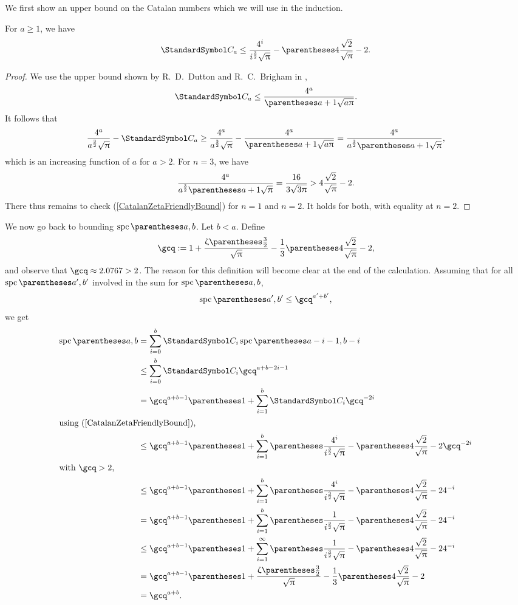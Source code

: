 We first show an upper bound on the Catalan numbers which we will use in the induction.
\begin{remark}
For $a\geq 1$, we have\begin{equation}
\CatalanNumber a \leq \frac{4^i}{i^{\frac 3 2}\sqrt{\Pi}}-\pa{4\frac {\sqrt 2} {\sqrt \Pi}-2} \text.\label{CatalanZetaFriendlyBound}
\end{equation}
\begin{proof}
We use the upper bound shown by R.~D.~Dutton and R.~C.~Brigham in \cite{DuttonBrigham1986},\[
\CatalanNumber a\leq \frac{4^a}{\pa{a+1}\sqrt{a\Pi}}\text.
\]
It follows that\[
\frac{4^a}{a^{\frac 3 2}\sqrt{\Pi}} - \CatalanNumber a \geq \frac{4^a}{a^{\frac 3 2}\sqrt{\Pi}} - \frac{4^a}{\pa{a+1}\sqrt{a\Pi}} = \frac{4^a}{a^{\frac 3 2}\pa{a+1}\sqrt{\Pi}}\text,
\]
which is an increasing function of $a$ for $a>2$. For $n=3$, we have\[
\frac{4^a}{a^{\frac 3 2}\pa{a+1}\sqrt{\Pi}}=\frac{16}{3\sqrt{3\Pi}}>4\frac {\sqrt 2} {\sqrt \Pi}-2\text.
\]
There thus remains to check (\ref{CatalanZetaFriendlyBound}) for $n=1$ and $n=2$. It holds for both, with equality at $n=2$.
\end{proof}
\end{remark}
We now go back to bounding $\spc\of{a,b}$.
Let $b<a$. Define\[
\gcq\DefineAs 1+\frac{\RiemannZeta\of{\frac 3 2}}{\sqrt{\Pi}}-\frac{1}{3}\pa{4\frac {\sqrt 2} {\sqrt \Pi}-2}\text,
\]
and observe that $\gcq\approx 2.0767 > 2$. The reason for this definition will become clear at the end of the calculation.
Assuming that for all $\spc\of{a',b'}$ involved in the sum
for $\spc\of{a,b}$,\[
\spc\of{a',b'}\leq\gcq^{a'+b'}\text,
\]
we get\begin{align*}
\spc\of{a,b} &= \sum{i=0}[b] \CatalanNumber {i} \spc\of{a-i-1,b-i} \\
 &\leq \sum{i=0}[b] \CatalanNumber {i} \gcq^{a+b-2i-1} \\
 &= \gcq^{a+b-1}\pa{1+\sum{i=1}[b] \CatalanNumber {i} \gcq^{-2i}}\\
\intertext{using (\ref{CatalanZetaFriendlyBound}),}
 &\leq \gcq^{a+b-1}\pa{1+\sum{i=1}[b] \pa{\frac{4^i}{i^{\frac 3 2}\sqrt{\Pi}}-\pa{4\frac {\sqrt 2} {\sqrt \Pi}-2}} \gcq^{-2i}} \\
\intertext{with $\gcq > 2$,}
 &\leq \gcq^{a+b-1}\pa{1+\sum{i=1}[b] \pa{\frac{4^i}{i^{\frac 3 2}\sqrt{\Pi}}-\pa{4\frac {\sqrt 2} {\sqrt \Pi}-2}} 4^{-i}} \\
 &= \gcq^{a+b-1}\pa{1+\sum{i=1}[b] \pa{\frac{1}{i^{\frac 3 2}\sqrt{\Pi}}-\pa{4\frac {\sqrt 2} {\sqrt \Pi}-2} 4^{-i}}} \\
 &\leq \gcq^{a+b-1}\pa{1+\sum{i=1}[\infty] \pa{\frac{1}{i^{\frac 3 2}\sqrt{\Pi}}-\pa{4\frac {\sqrt 2} {\sqrt \Pi}-2} 4^{-i}}} \\
 &= \gcq^{a+b-1}\pa{1+\frac{\RiemannZeta\of{\frac 3 2}}{\sqrt{\Pi}}-\frac{1}{3}\pa{4\frac {\sqrt 2} {\sqrt \Pi}-2}} \\
 &= \gcq^{a+b}\text.
\end{align*}
